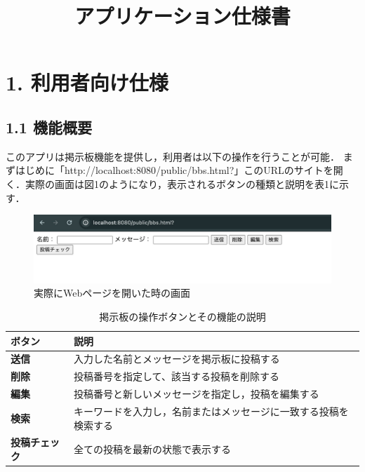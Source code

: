 \documentclass[uplatex,dvipdfmx]{jsarticle}
\title{アプリケーション仕様書}
\begin{document}
\maketitle

\section*{1. 利用者向け仕様}
\subsection*{1.1 機能概要}
このアプリは掲示板機能を提供し，利用者は以下の操作を行うことが可能．
まずはじめに「http://localhost:8080/public/bbs.html?」このURLのサイトを開く．実際の画面は図1のようになり，表示されるボタンの種類と説明を表1に示す．
\begin{figure}[H]
\centering
 \centering
\includegraphics[width=15cm]{ttt.jpg}
\caption{実際にWebページを開いた時の画面}
\label{fig:b02}
\end{figure}
\begin{longtable}{|l|l|}
\caption{掲示板の操作ボタンとその機能の説明} \\ %
\hline
\textbf{ボタン} & \textbf{説明} \\
\hline
\textbf{送信} & 入力した名前とメッセージを掲示板に投稿する \\
\hline
\textbf{削除} & 投稿番号を指定して、該当する投稿を削除する \\
\hline
\textbf{編集} & 投稿番号と新しいメッセージを指定し，投稿を編集する \\
\hline
\textbf{検索} & キーワードを入力し，名前またはメッセージに一致する投稿を検索する \\
\hline
\textbf{投稿チェック} & 全ての投稿を最新の状態で表示する \\
\hline
\end{longtable}
\end{document}
